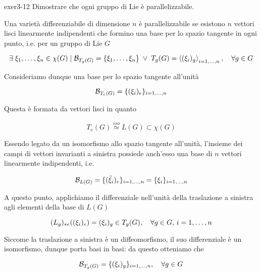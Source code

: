 {exer3-12}
{
Dimostrare che ogni gruppo di Lie è parallelizzabile.
}
{
Una varietà differenziabile di dimensione $ n $ è parallelizzabile se esistono $ n $ vettori lisci linearmente indipendenti che formino una base per lo spazio tangente in ogni punto, i.e. per un gruppo di Lie $ G $

\begin{equation}
	\E \xi_{1}, \dots, \xi_{n} \in \chi(G) \mid %
	\B_{T_{g}(G)} = \left\{ \xi_{1}, \dots, \xi_{n} \right\} %
	\; \lor \; T_{g}(G) = \ev{(\xi_{i})_{g}}_{i=1,\dots,n} %
	\qcomma \forall g \in G
\end{equation}

Consideriamo dunque una base per lo spazio tangente all'unità

\begin{equation}
	\mathcal{B}_{T_{e}(G)} = \{(\xi_{i})_{e}\}_{i=1,\dots,n}
\end{equation}

Questa è formata da vettori lisci in quanto

\begin{equation}
	T_{e}(G) \stackrel{iso}{\simeq} L(G) \subset \chi(G)
\end{equation}

Essendo legato da un isomorfismo allo spazio tangente all'unità, l'insieme dei campi di vettori invarianti a sinistra possiede anch'esso una base di $ n $ vettori linearmente indipendenti, i.e.

\begin{equation}
	\B_{L(G)} = \{(\hat{\xi}_{i})_{e}\}_{i=1,\dots,n} %
	= \{\xi_{i}\}_{i=1,\dots,n}
\end{equation}

A questo punto, applichiamo il differenziale nell'unità della traslazione a sinistra agli elementi della base di $ L(G) $

\begin{equation}
	(L_{g})_{*e} ((\xi_{i})_{e}) = (\xi_{i})_{g} \in T_{g}(G) \qcomma \forall g \in G, \, i=1,\dots,n
\end{equation}

Siccome la traslazione a sinistra è un diffeomorfismo, il suo differenziale è un isomorfismo, dunque porta basi in basi: da questo otteniamo che

\begin{equation}
	\B_{T_{g}(G)} = \{(\xi_{i})_{g}\}_{i=1,\dots,n} \qcomma \forall g \in G
\end{equation}

}
